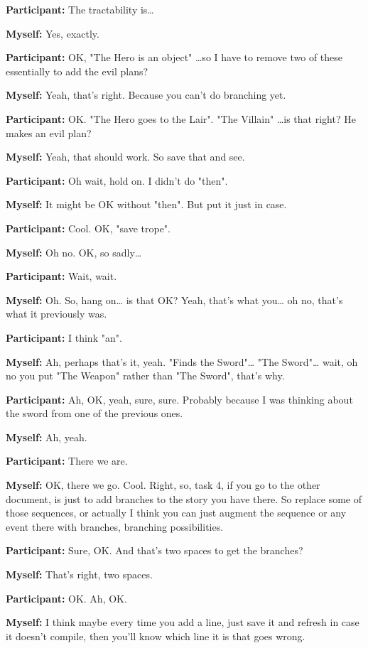 \documentclass[11pt]{report}
\begin{document}
\begin{linenumbers}
\textbf{Participant:} The tractability is\ldots{}

\textbf{Myself:} Yes, exactly.

\textbf{Participant:} OK, "The Hero is an object" \ldots{}so I have to remove two of these essentially to add the evil plans?

\textbf{Myself:} Yeah, that's right. Because you can't do branching yet.

\textbf{Participant:} OK. "The Hero goes to the Lair". "The Villain" \ldots{}is that right? He makes an evil plan?

\textbf{Myself:} Yeah, that should work. So save that and see.

\textbf{Participant:} Oh wait, hold on. I didn't do "then".

\textbf{Myself:} It might be OK without "then". But put it just in case.

\textbf{Participant:} Cool. OK, "save trope".

\textbf{Myself:} Oh no. OK, so sadly\ldots{}

\textbf{Participant:} Wait, wait.

\textbf{Myself:} Oh. So, hang on\ldots{} is that OK? Yeah, that's what you\ldots{} oh no, that's what it previously was.

\textbf{Participant:} I think "an".

\textbf{Myself:} Ah, perhaps that's it, yeah. "Finds the Sword"\ldots{} "The Sword"\ldots{} wait, oh no you put "The Weapon" rather than "The Sword", that's why.

\textbf{Participant:} Ah, OK, yeah, sure, sure. Probably because I was thinking about the sword from one of the previous ones.

\textbf{Myself:} Ah, yeah.

\textbf{Participant:} There we are.

\textbf{Myself:} OK, there we go. Cool. Right, so, task 4, if you go to the other document, is just to add branches to the story you have there. So replace some of those sequences, or actually I think you can just augment the sequence or any event there with branches, branching possibilities.

\textbf{Participant:} Sure, OK. And that's two spaces to get the branches?

\textbf{Myself:} That's right, two spaces.

\textbf{Participant:} OK. Ah, OK.

\textbf{Myself:} I think maybe every time you add a line, just save it and refresh in case it doesn't compile, then you'll know which line it is that goes wrong.


\end{linenumbers}
\end{document}
